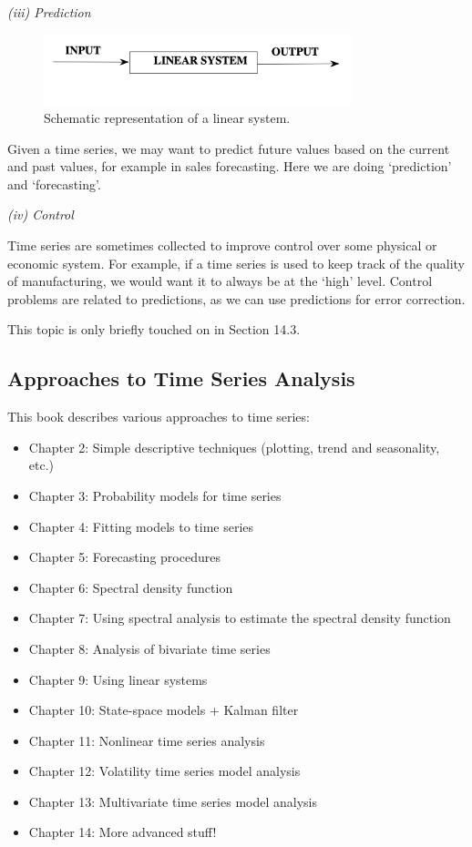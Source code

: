 \textit{(iii) Prediction}

\begin{figure}[h]
	\centering
	\includegraphics[width=0.8\textwidth]{Chapter 1/fig1-9.png}
	\caption{Schematic representation of a linear system.}
	\label{fig:1.9}
\end{figure}

Given a time series, we may want to predict future values based on the current and past values, for example in sales forecasting. Here we are doing `prediction' and `forecasting'.

\textit{(iv) Control}

Time series are sometimes collected to improve control over some physical or economic system. For example, if a time series is used to keep track of the quality of manufacturing, we would want it to always be at the `high' level. Control problems are related to predictions, as we can use predictions for error correction.

This topic is only briefly touched on in Section 14.3.



\subsection{Approaches to Time Series Analysis}
This book describes various approaches to time series: 
\begin{itemize}
	\item Chapter 2: Simple descriptive techniques (plotting, trend and seasonality, etc.)
	\item Chapter 3: Probability models for time series
	\item Chapter 4: Fitting models to time series
	\item Chapter 5: Forecasting procedures
	\item Chapter 6: Spectral density function
	\item Chapter 7: Using spectral analysis to estimate the spectral density function
	\item Chapter 8: Analysis of bivariate time series
	\item Chapter 9: Using linear systems 
	\item Chapter 10: State-space models + Kalman filter
	\item Chapter 11: Nonlinear time series analysis
	\item Chapter 12: Volatility time series model analysis
	\item Chapter 13: Multivariate time series model analysis
	\item Chapter 14: More advanced stuff!
\end{itemize}



